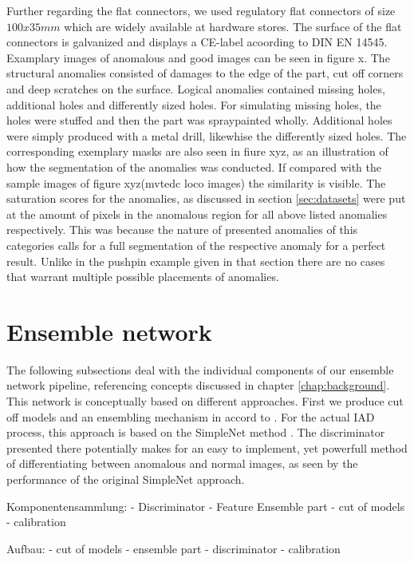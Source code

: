 Further regarding the flat connectors, we used regulatory flat connectors of size $100x35 mm$ which are widely available at hardware stores. The surface of the flat connectors is galvanized 
and displays a CE-label acoording to DIN EN 14545.
Examplary images of anomalous and good images can be seen in figure x. The structural anomalies consisted of damages to the edge of the part, cut off corners and deep scratches on the surface. 
Logical anomalies contained missing holes, additional holes and differently sized holes. For simulating missing holes, the holes were stuffed and then the part was spraypainted wholly. 
Additional holes were simply produced with a metal drill, likewhise the differently sized holes. 
The corresponding exemplary masks are also seen in fiure xyz, as an illustration of how the segmentation of the anomalies was conducted. If compared with the sample images of figure xyz(mvtedc loco images) 
the similarity is visible. The saturation scores for the anomalies, as discussed in section \ref{sec:datasets} were put at the amount of pixels in the anomalous region for all above listed anomalies respectively.
This was because the nature of presented anomalies of this categories calls for a full segmentation of the respective anomaly for a perfect result. Unlike in the pushpin example given in that section 
there are no cases that warrant multiple possible placements of anomalies.


\section{Ensemble network}
\label{sec:ourensemblenetwork}

The following subsections deal with the individual components of our ensemble network pipeline, referencing concepts discussed in chapter \ref{chap:background}. This network is conceptually based on 
different approaches. First we produce cut off models and an ensembling mechanism in accord to \cite{EnsembleHeller2023}. For the actual IAD process, this approach is based on the SimpleNet method \cite{liu2023simplenet}. 
The discriminator presented there potentially makes for an easy to implement, yet powerfull method of differentiating between anomalous and normal images, as seen by the performance of the original 
SimpleNet approach. 

Komponentensammlung:
- Discriminator
- Feature Ensemble part
- cut of models
- calibration

Aufbau:
- cut of models
- ensemble part
- discriminator
- calibration



